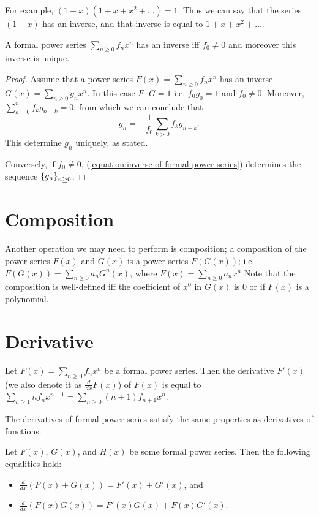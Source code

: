 For example, $(1 - x) (1 + x + x^2 + \dots) = 1$. Thus we can say that the
series $(1 - x)$ has an inverse, and that inverse is equal to $1 + x + x^2 +
\dots$.
\begin{theorem}
  A formal power series $\sum_{n \ge 0} f_n x^n$ has an inverse iff
  $f_0 \neq 0$ and moreover this inverse is unique.
\end{theorem}
\begin{proof}
  Assume that a power series $F(x) = \sum_{n \ge 0} f_n x^n$ has an inverse
  $G(x) = \sum_{n \ge 0} g_n x^n$. In this case $F \cdot G = 1$ i.e.
  $f_0 g_0 = 1$ and $f_0 \neq 0$. Moreover,
  $\sum_{k = 0}^n f_k g_{n - k} = 0$; from which we can conclude that
  \begin{equation}
    \label{equation:inverse-of-formal-power-series}
    g_n = -\frac{1}{f_0} \sum_{k > 0} f_k g_{n - k}.
  \end{equation}
  This determine $g_n$ uniquely, as stated.

  Conversely, if $f_0 \neq 0$, (\ref{equation:inverse-of-formal-power-series})
  determines the sequence $\set{g_n}_{n \ge 0}$.
\end{proof}

\section{Composition}
Another operation we may need to perform is composition; a composition of
the power series $F(x)$ and $G(x)$ is a power series $F(G(x))$; i.e.
$F(G(x)) = \sum_{n \ge 0} a_n G^n(x)$, where $F(x) = \sum_{n \ge 0} a_n x^n$
Note that the composition is well-defined iff the coefficient of $x^0$ in $G(x)$
is $0$ or if $F(x)$ is a polynomial.

\section{Derivative}
Let $F(x) = \sum_{n \ge 0} f_n x^n$ be a formal power series. Then the
derivative $F'(x)$ (we also denote it as $\frac{d}{dx} F(x)$) of $F(x)$ is
equal to
$\sum_{n \ge 1} n f_n x^{n - 1} = \sum_{n \ge 0} (n + 1) f_{n + 1} x^n$.

The derivatives of formal power series satisfy the same properties as
derivatives of functions.
\begin{theorem}
  Let $F(x)$, $G(x)$, and $H(x)$ be some formal power series. Then the following
  equalities hold:
  \begin{itemize}
    \item $\frac{d}{dx}(F(x) + G(x)) = F'(x) + G'(x)$, and
    \item $\frac{d}{dx}(F(x) G(x)) = F'(x)G(x) + F(x)G'(x)$.
  \end{itemize}
\end{theorem}

